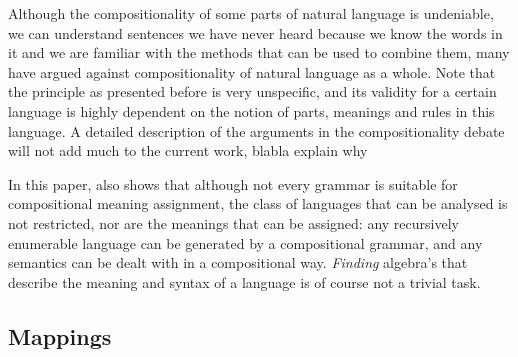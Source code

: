 \documentclass{report}
\theoremstyle{definition}
\theoremstyle{plain}
\begin{document}
Although the compositionality of some parts of natural language is undeniable, we can understand sentences we have never heard because we know the words in it and we are familiar with the methods that can be used to combine them, many have argued against compositionality of natural language as a whole. Note that the principle as presented before is very unspecific, and its validity for a certain language is highly dependent on the notion of parts, meanings and rules in this language. A detailed description of the arguments in the compositionality debate will not add much to the current work, 
blabla explain why

In this paper, \citeauthor{janssen1996compositionality} also shows that although not every grammar is suitable for compositional meaning assignment, the class of languages that can be analysed is not restricted, nor are the meanings that can be assigned: any recursively enumerable language can be generated by a compositional grammar, and any semantics can be dealt with in a compositional way. \textit{Finding} algebra's that describe the meaning and syntax of a language is of course not a trivial task.

\subsection{Mappings}
\end{document}

